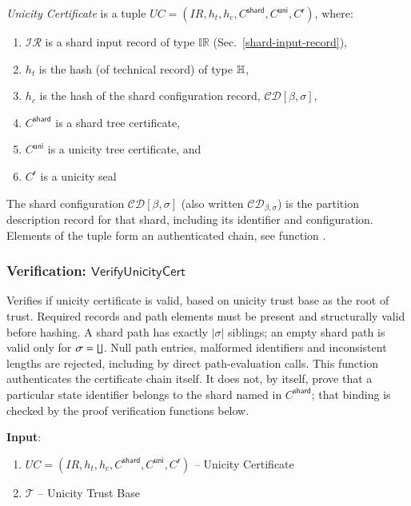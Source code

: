 \emph{Unicity Certificate} is a tuple $UC = (IR, h_t, h_c, C^\mathsf{shard}, C^\mathsf{uni}, C^\mathsf{r})$, where:
\begin{enumerate}
    \item $\mathcal{IR}$ is a shard input record of type $\mathbb{IR}$ (Sec.~\ref{shard-input-record}),
    \item $h_t$ is the hash (of technical record) of type $\mathbb{H}$,
    \item $h_c$ is the hash of the shard configuration record, $\mathcal{CD}[\beta,\sigma]$,
    \item $C^\mathsf{shard}$ is a shard tree certificate,
    \item $C^\mathsf{uni}$ is a unicity tree certificate, and
    \item $C^\mathsf{r}$ is a unicity seal
\end{enumerate}

The shard configuration $\mathcal{CD}[\beta,\sigma]$ (also written $\mathcal{CD}_{\beta,\sigma}$) is the partition description record for that shard, including its identifier and configuration. Elements of the tuple form an authenticated chain, see function .


\subsubsection{Verification: $\mathsf{VerifyUnicityCert}$}\label{VerifyUnicityCert}

Verifies if unicity certificate is valid, based on unicity trust base as the root of trust.
Required records and path elements must be present and structurally valid before hashing. A shard path has exactly $|\sigma|$ siblings; an empty shard path is valid only for $\sigma=\lfloor\!\rfloor$. Null path entries, malformed identifiers and inconsistent lengths are rejected, including by direct path-evaluation calls. This function authenticates the certificate chain itself. It does not, by itself, prove that a particular state identifier belongs to the shard named in $C^\mathsf{shard}$; that binding is checked by the proof verification functions below.

\textbf{Input}:
\begin{enumerate}
	\item $UC = (IR, h_t, h_c, C^\mathsf{shard}, C^\mathsf{uni}, C^\mathsf{r})$ -- Unicity Certificate
	\item $\mathcal{T}$ -- Unicity Trust Base
\end{enumerate}

